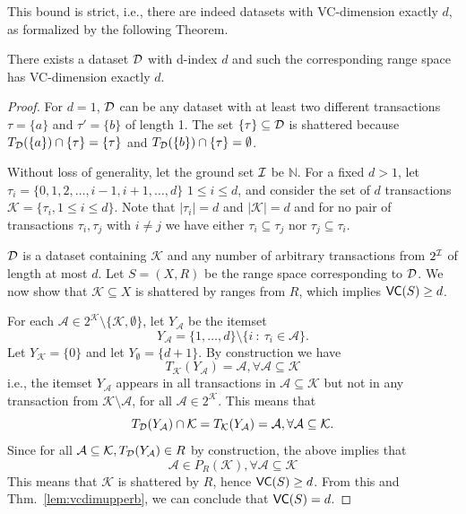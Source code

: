 This bound is strict, i.e., there are indeed datasets with VC-dimension exactly
$d$, as formalized by the following Theorem.

\begin{theorem}\label{lem:vcdimlowerb}
  There exists a dataset ${\cal D}$ with d-index $d$ and such the corresponding range
  space has VC-dimension exactly $d$.
\end{theorem}

\begin{proof}
  For $d=1$, ${\cal D}$ can be any dataset with at least two different transactions
  $\tau=\{a\}$ and $\tau'=\{b\}$ of length 1. The set $\{\tau\}\subseteq{\cal D}$ is
  shattered because $T_{\cal D}(\{a\})\cap\{\tau\}=\{\tau\}$ and
  $T_{\cal D}(\{b\})\cap\{\tau\}=\emptyset$.

  Without loss of generality, let the ground set ${\cal I}$ be $\mathbb{N}$. For a
  fixed $d>1$, let $\tau_i=\{0,1,2,\dots,i-1,i+1,\dots,d\}$
  $1\le i\le d$, and consider the set of $d$ transactions $\mathcal{K}=\{\tau_i,
  1\le i\le d\}$.  Note that $|\tau_i|=d$ and $|\mathcal{K}|=d$ and for no pair
  of transactions $\tau_i,\tau_j$ with $i\neq j$ we have either
  $\tau_i\subseteq\tau_j$ nor $\tau_j\subseteq\tau_i$.
  
  ${\cal D}$ is a dataset containing $\mathcal{K}$ and any number of arbitrary
  transactions from $2^{\cal I}$ of length at most $d$. Let $S=(X,R)$ be the range
  space corresponding to ${\cal D}$. We now show that $\mathcal{K}\subseteq X$ is
  shattered by ranges from $R$, which implies
  $\mathsf{VC}(S)\ge d$. 
  
  For each $\mathcal{A}\in 2^\mathcal{K}\setminus\{\mathcal{K},\emptyset\}$, let
  $Y_\mathcal{A}$ be the itemset 
  \[ 
  Y_\mathcal{A}=\{1,\dots,d\}\setminus \{i ~:~
  \tau_i \in \mathcal{A}\}.
  \]
  Let $Y_\mathcal{K}=\{0\}$ and let $Y_\emptyset=\{d+1\}$. By construction we
  have
  \[
  T_\mathcal{K}(Y_\mathcal{A})=\mathcal{A}, \forall \mathcal{A}\subseteq\mathcal{K}
  \]
  i.e., the itemset $Y_\mathcal{A}$ appears in all transactions in $\mathcal{A}\subseteq \mathcal{K}$
  but not in any transaction from $\mathcal{K}\setminus\mathcal{A}$, for all $\mathcal{A}\in 2^{\mathcal{K}}$. This means that
  \[
  T_{\cal D}(Y_\mathcal{A})\cap \mathcal{K} = T_\mathcal{K}(Y_\mathcal{A}) =
  \mathcal{A}, \forall \mathcal{A}\subseteq\mathcal{K}.
  \]
  Since for all $\mathcal{A}\subseteq\mathcal{K}, T_{\cal D}(Y_\mathcal{A})\in R$ by
  construction, the above implies that
  \[
  \mathcal{A}\in P_R(\mathcal{K}), \forall \mathcal{A}\subseteq\mathcal{K}
  \]
  This means that $\mathcal{K}$ is shattered by $R$, hence $\mathsf{VC}(S)\ge d$. From
  this and Thm.~\ref{lem:vcdimupperb}, we can conclude that $\mathsf{VC}(S)=d$.
\end{proof}

